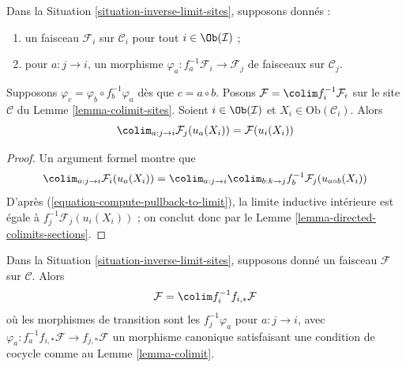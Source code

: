 \begin{lemma}
\label{lemma-colimit}
Dans la Situation \ref{situation-inverse-limit-sites}, supposons donnés :
\begin{enumerate}
\item un faisceau $\mathcal{F}_i$ sur $\mathcal{C}_i$ pour tout
$i \in \Ob(\mathcal{I})$ ;
\item pour $a : j \to i$, un morphisme
$\varphi_a : f_a^{-1}\mathcal{F}_i \to \mathcal{F}_j$
de faisceaux sur $\mathcal{C}_j$.
\end{enumerate}
Supposons $\varphi_c = \varphi_b \circ f_b^{-1}\varphi_a$
dès que $c = a \circ b$. Posons
$\mathcal{F} = \colim f_i^{-1}\mathcal{F}_i$
sur le site $\mathcal{C}$ du Lemme \ref{lemma-colimit-sites}.
Soient $i \in \Ob(\mathcal{I})$ et $X_i \in \text{Ob}(\mathcal{C}_i)$. Alors
$$
\colim_{a : j \to i} \mathcal{F}_j(u_a(X_i)) = \mathcal{F}(u_i(X_i))
$$
\end{lemma}

\begin{proof}
Un argument formel montre que
$$
\colim_{a : j \to i} \mathcal{F}_i(u_a(X_i)) =
\colim_{a : j \to i} \colim_{b : k \to j}
f_b^{-1}\mathcal{F}_j(u_{a \circ b}(X_i))
$$
D’après (\ref{equation-compute-pullback-to-limit}), la limite inductive
intérieure est égale à $f_j^{-1}\mathcal{F}_j(u_i(X_i))$ ;
on conclut donc par le Lemme \ref{lemma-directed-colimits-sections}.
\end{proof}

\begin{lemma}
\label{lemma-colimit-push-pull}
Dans la Situation \ref{situation-inverse-limit-sites}, supposons donné
un faisceau $\mathcal{F}$ sur $\mathcal{C}$. Alors
$$
\mathcal{F} = \colim f_i^{-1}f_{i, *}\mathcal{F}
$$
où les morphismes de transition sont les $f_j^{-1}\varphi_a$
pour $a : j \to i$, avec
$\varphi_a : f_a^{-1}f_{i, *}\mathcal{F} \to f_{j, *}\mathcal{F}$
un morphisme canonique satisfaisant une condition de cocycle comme au
Lemme \ref{lemma-colimit}.
\end{lemma}

